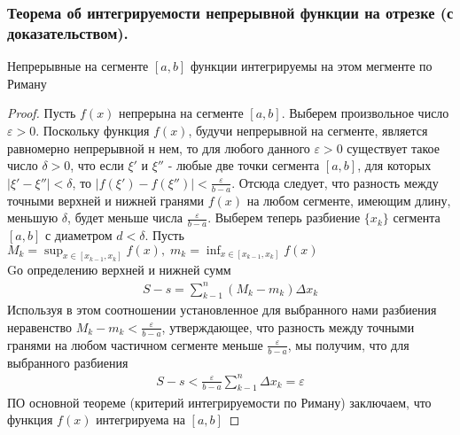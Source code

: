 \documentclass[10pt]{article}
\begin{document}
    \subsubsection{Теорема об интегрируемости непрерывной функции на отрезке (с доказательством).}
    \begin{theorem}
        Непрерывные на сегменте $[a, b]$ функции интегрируемы на этом мегменте по Риману
    \end{theorem}
    \begin{proof}
        Пусть $f(x)$ непрерына на сегменте $[a, b]$. Выберем произвольное число $\varepsilon > 0$. Поскольку функция $f(x)$, будучи непрерывной на сегменте, является равномерно непрерывной н нем, то для любого данного $\varepsilon > 0$ существует такое число $\delta > 0$, что если $\xi'$ и $\xi''$ - любые две точки сегмента $[a, b]$, для которых $|\xi' - \xi''| < \delta$, то $|f(\xi') - f(\xi'')| < \frac{\varepsilon}{b-a}$. Отсюда следует, что разность между точными верхней и нижней гранями $f(x)$ на любом сегменте, имеющим длину, меньшую $\delta$, будет меньше числа $\frac{\varepsilon}{b-a}$. Выберем теперь разбиение $\{x_k\}$ сегмента $[a, b]$ с диаметром $d<\delta$. Пусть $M_k = \sup_{x \in [x_{k-1}, x_k]} f(x),\; m_k= \inf_{x \in [x_{k-1}, x_k]} f(x)$\\
        Gо определению верхней и нижней сумм
        \begin{gather*}
            S-s = \sum_{k-1}^n (M_k - m_k) \Delta x_k
        \end{gather*}
        Используя в этом соотношении установленное для выбранного нами разбиения неравенство $M_k - m_k < \frac{\varepsilon}{b-a}$, утверждающее, что разность между точными гранями на любом частичном сегменте меньше $\frac{\varepsilon}{b-a}$, мы получим, что для выбранного разбиения
        \begin{gather*}
            S-s<\frac{\varepsilon}{b-a}\sum_{k-1}^n \Delta x_k = \varepsilon
        \end{gather*}
        ПО основной теореме (критерий интегрируемости по Риману) заключаем, что функция $f(x)$ интегрируема на $[a, b]$
    \end{proof}
\end{document}
